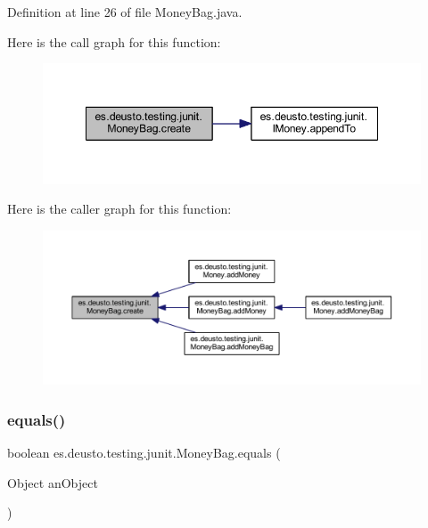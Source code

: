 Definition at line 26 of file Money\+Bag.\+java.

Here is the call graph for this function\+:\nopagebreak
\begin{figure}[H]
\begin{center}
\leavevmode
\includegraphics[width=348pt]{classes_1_1deusto_1_1testing_1_1junit_1_1_money_bag_a8d2d54a342d2de2b75530600123efc9a_cgraph}
\end{center}
\end{figure}
Here is the caller graph for this function\+:\nopagebreak
\begin{figure}[H]
\begin{center}
\leavevmode
\includegraphics[width=350pt]{classes_1_1deusto_1_1testing_1_1junit_1_1_money_bag_a8d2d54a342d2de2b75530600123efc9a_icgraph}
\end{center}
\end{figure}
\mbox{\label{classes_1_1deusto_1_1testing_1_1junit_1_1_money_bag_a80926d10c9619bd2ad84eabe52ca03bb}} 
\subsubsection{\texorpdfstring{equals()}{equals()}}
{\footnotesize\ttfamily boolean es.\+deusto.\+testing.\+junit.\+Money\+Bag.\+equals (\begin{DoxyParamCaption}\item[{Object}]{an\+Object }\end{DoxyParamCaption})}



